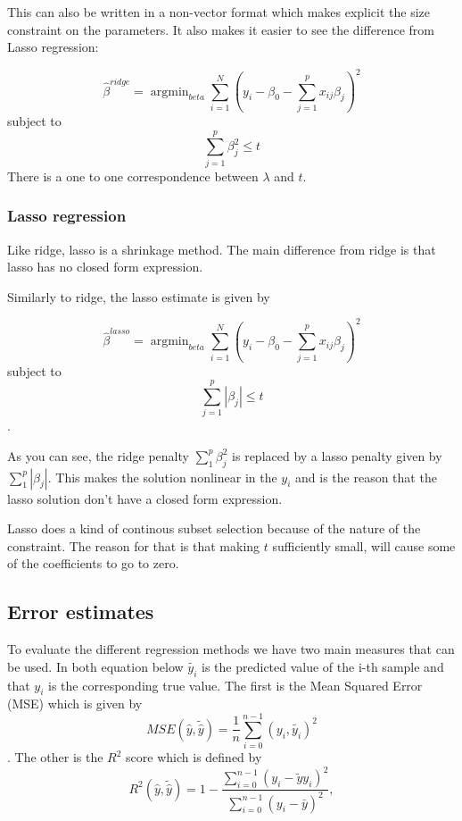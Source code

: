 This can also be written in a non-vector format which makes 
explicit the size constraint on the parameters. 
It also makes it easier to see the difference from Lasso regression:

\begin{equation}
	\hat{\beta}^{ridge} = \operatorname{argmin}_{beta} 
							\sum\limits_{i=1}^N \left(y_i - \beta_0
							-\sum\limits_{j=1}^p x_{ij}\beta_j\right)^2
\end{equation}
subject to
\begin{equation}
	\sum\limits_{j=1}^p \beta_j^2 \leq t
\end{equation}
There is a one to one correspondence between \(\lambda\) and \(t\).
\cite{IntroStatistics} 

\subsubsection{Lasso regression}
Like ridge, lasso is a shrinkage method. The main difference from 
ridge is that lasso has no closed form expression. ~\cite{IntroStatistics} 

Similarly to ridge, the lasso estimate is given by

\begin{equation}
	\hat{\beta}^{lasso} = \operatorname{argmin}_{beta} 
							\sum\limits_{i=1}^N \left(y_i - \beta_0
							-\sum\limits_{j=1}^p x_{ij}\beta_j\right)^2
\end{equation}
subject to
\begin{equation}
	\sum\limits_{j=1}^p |\beta_j| \leq t
\end{equation}.

As you can see, the ridge penalty \(\sum_1^p \beta_j^2\) is replaced 
by a lasso penalty given by \(\sum_1^p |\beta_j|\). 
This makes the solution nonlinear in the \(y_i\) and is the reason
that the lasso solution don't have a closed form expression.

Lasso does a kind of continous subset selection because of the nature of 
the constraint. The reason for that is that making \(t\) sufficiently small,
will cause some of the coefficients to go to zero. ~\cite{IntroStatistics} 

\subsection{Error estimates}
To evaluate the different regression methods we have two main
measures that can be used. In both equation below \(\widetilde{y_i}\) is 
the predicted value of the i-th sample and that \(y_i\) is the corresponding
true value. \cite{Project1} 
The first is the Mean Squared Error (MSE) which is given by 
\begin{equation}
	MSE(\hat{y}, \widetilde{\hat{y}}) = \frac{1}{n}\sum\limits_{i=0}^{n-1}
	(y_i, \widetilde{y_i})^2 
\end{equation}.
The other is the \(R^2\) score which is defined by
\begin{equation}
	R^2(\hat{y}, \tilde{\hat{y}}) = 1 - \frac{\sum_{i=0}^{n - 1} (y_i - \tilde{		y}	y_i)^2}{\sum_{i=0}^{n - 1} (y_i - \bar{y})^2},
\end{equation}

